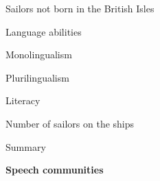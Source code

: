\begin{listWWNumvleveli}
\begin{listWWNumvlevelii}
\begin{listWWNumvleveliii}
\item 
\begin{styleNormali}
Sailors not born in the British Isles 
\end{styleNormali}

\end{listWWNumvleveliii}
\item 
\begin{styleListParagraph}
Language abilities
\end{styleListParagraph}


\setcounter{listWWNumvleveliii}{0}
\begin{listWWNumvleveliii}
\item 
\begin{styleListParagraph}
Monolingualism
\end{styleListParagraph}

\item 
\begin{styleListParagraph}
Plurilingualism 
\end{styleListParagraph}

\end{listWWNumvleveliii}
\item 
\begin{styleListParagraph}
Literacy 
\end{styleListParagraph}

\item 
\begin{styleListParagraph}
Number of sailors on the ships 
\end{styleListParagraph}

\item 
\begin{styleListParagraph}
Summary
\end{styleListParagraph}

\end{listWWNumvlevelii}
\end{listWWNumvleveli}
\setcounter{listWWNumiileveli}{0}
\begin{listWWNumiileveli}
\item 
\begin{styleListParagraph}
\textbf{Speech communities }
\end{styleListParagraph}

\end{listWWNumiileveli}
\setcounter{listWWNumvileveli}{3}
